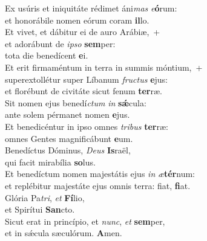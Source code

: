 \evenverse Ex usúris et iniquitáte rédimet áni\textit{mas} \textit{e}\textbf{ó}rum:~\*\\
\evenverse et honorábile nomen eórum coram \textbf{il}lo.\\
\oddverse Et vivet, et dábitur ei de auro Arábiæ,~+\\
\oddverse  et adorábunt de \textit{i}\textit{pso} \textbf{sem}per:~\*\\
\oddverse tota die benedícent \textbf{e}i.\\
\evenverse Et erit firmaméntum in terra in summis móntium,~+\\
\evenverse  superextollétur super Líbanum \textit{fru}\textit{ctus} \textbf{e}jus:~\*\\
\evenverse et florébunt de civitáte sicut fenum \textbf{ter}ræ.\\
\oddverse Sit nomen ejus benedí\textit{ctum} \textit{in} \textbf{sǽ}cula:~\*\\
\oddverse ante solem pérmanet nomen \textbf{e}jus.\\
\evenverse Et benedicéntur in ipso omnes \textit{tri}\textit{bus} \textbf{ter}ræ:~\*\\
\evenverse omnes Gentes magnificábunt \textbf{e}um.\\
\oddverse Benedíctus Dóminus, \textit{De}\textit{us} \textbf{Is}raël,~\*\\
\oddverse qui facit mirabília \textbf{so}lus.\\
\evenverse Et benedíctum nomen majestátis ejus \textit{in} \textit{æ}\textbf{tér}num:~\*\\
\evenverse et replébitur majestáte ejus omnis terra: fiat, \textbf{fi}at.\\
\oddverse Glória Pa\textit{tri}, \textit{et} \textbf{Fí}lio,~\*\\
\oddverse et Spirítui \textbf{San}cto.\\
\evenverse Sicut erat in princípio, et \textit{nunc}, \textit{et} \textbf{sem}per,~\*\\
\evenverse et in sǽcula sæculórum. \textbf{A}men.\\
